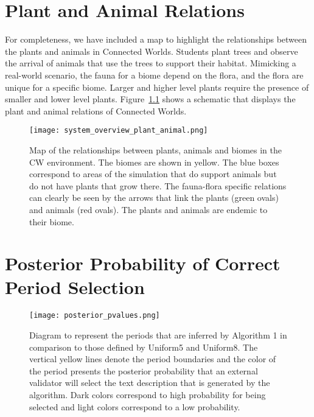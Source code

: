 \begin{appendices}

\chapter{Plant and Animal Relations}\label{cha:appendix2}
For completeness, we have included a map to highlight the relationships between the plants and animals in Connected Worlds. Students plant trees and observe the arrival of animals that use the trees to support their habitat. Mimicking a real-world scenario, the fauna for a biome depend on the flora, and the flora are unique for a specific biome. Larger and higher level plants require the presence of smaller and lower level plants. Figure~\ref{fig:system_overview_plant_animal} shows a schematic that displays the plant and animal relations of Connected Worlds.

\begin{figure}
\centering
\texttt{[image: system\_overview\_plant\_animal.png]}
\caption{Map of the relationships between plants, animals and biomes in the CW environment. The biomes are shown in yellow. The blue boxes correspond to areas of the simulation that do support animals but do not have plants that grow there. The fauna-flora specific relations can clearly be seen by the arrows that link the plants (green ovals) and animals (red ovals). The plants and animals are endemic to their biome.}
\label{fig:system_overview_plant_animal}
\end{figure}



\chapter{Posterior Probability of Correct Period Selection}\label{cha:appendix1}
\begin{figure}
\centering
\texttt{[image: posterior\_pvalues.png]}
\caption{Diagram to represent the periods that are inferred by Algorithm 1 in comparison to those defined by Uniform5 and Uniform8. The vertical yellow lines denote the period boundaries and the color of the period presents the posterior probability that an external validator will select the text description that is generated by the algorithm. Dark colors correspond to high probability for being selected and light colors correspond to a low probability.}
\label{fig:posterior_pvalues}
\end{figure}


\end{appendices}
